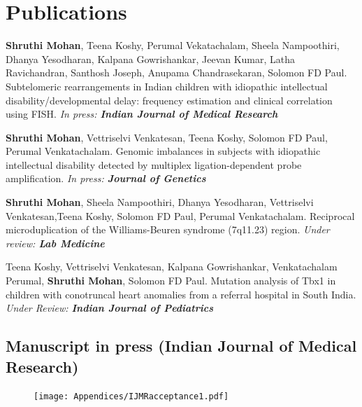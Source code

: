 \chapter{Publications}

\textbf{Shruthi Mohan}, Teena Koshy, Perumal Vekatachalam, Sheela Nampoothiri,
Dhanya Yesodharan, Kalpana Gowrishankar, Jeevan Kumar, Latha Ravichandran,
Santhosh \linebreak Joseph, Anupama Chandrasekaran, Solomon FD Paul.
Subtelomeric rearrangements in Indian children with idiopathic intellectual
disability/developmental delay: frequency estimation and clinical correlation
using FISH. \textit{In press: \textbf{Indian Journal of Medical Research}}

\textbf{Shruthi Mohan}, Vettriselvi Venkatesan, Teena Koshy, Solomon FD Paul,
Perumal Venkatachalam. Genomic imbalances in subjects with idiopathic
intellectual disability detected by multiplex ligation-dependent probe
amplification. \textit{In press: \textbf{Journal of Genetics}}

\textbf{Shruthi Mohan}, Sheela Nampoothiri, Dhanya Yesodharan, Vettriselvi
Venkatesan,\linebreak Teena Koshy, Solomon FD Paul, Perumal Venkatachalam.
Reciprocal microduplication  of the Williams-Beuren syndrome (7q11.23) region.
\textit{Under review: \textbf{Lab Medicine}}

Teena Koshy, Vettriselvi Venkatesan, Kalpana Gowrishankar, Venkatachalam
Perumal, \textbf{Shruthi Mohan}, Solomon FD Paul. Mutation analysis of Tbx1 in
children with \linebreak conotruncal heart anomalies from a referral hospital in
South India. \textit{Under Review: \textbf{Indian Journal of Pediatrics}}

\cleardoublepage

\section*{Manuscript in press (Indian Journal of Medical Research)}

\begin{figure}[!h]
\texttt{[image: Appendices/IJMRacceptance1.pdf]}
\end{figure}


